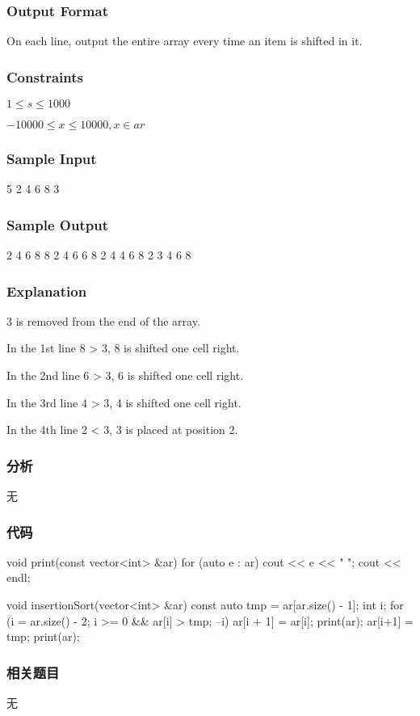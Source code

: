 \subsubsection{Output Format}
On each line, output the entire array every time an item is shifted in it.


\subsubsection{Constraints}
$1 \leq s \leq 1000$

$-10000 \leq x \leq 10000, x \in ar$


\subsubsection{Sample Input}
\begin{Code}
5
2 4 6 8 3
\end{Code}


\subsubsection{Sample Output}
\begin{Code}
2 4 6 8 8 
2 4 6 6 8 
2 4 4 6 8 
2 3 4 6 8 
\end{Code}


\subsubsection{Explanation}
3 is removed from the end of the array.

In the 1st line 8 > 3, 8 is shifted one cell right. 

In the 2nd line 6 > 3, 6 is shifted one cell right. 

In the 3rd line 4 > 3, 4 is shifted one cell right. 

In the 4th line 2 < 3, 3 is placed at position 2.


\subsubsection{分析}
无


\subsubsection{代码}
\begin{Code}
void print(const vector<int> &ar) {
    for (auto e : ar)
        cout << e << " ";
    cout << endl;
}

void insertionSort(vector<int>  &ar) {
    const auto tmp = ar[ar.size() - 1];
    int i;
    for (i = ar.size() - 2; i >= 0 && ar[i] > tmp; --i) {
        ar[i + 1] = ar[i];
        print(ar);
    }
    ar[i+1] = tmp;
    print(ar);
}
\end{Code}


\subsubsection{相关题目}
\begindot
\item 无
\myenddot
